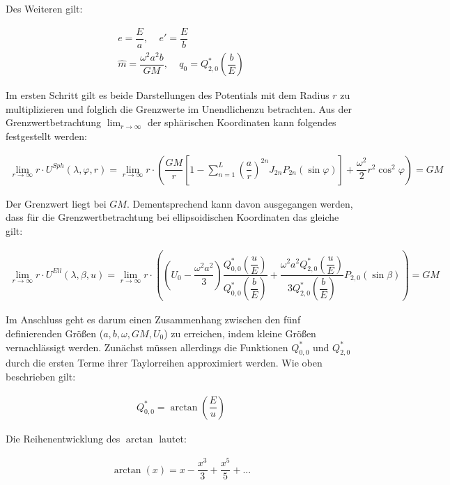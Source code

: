 Des Weiteren gilt:

\begin{gather*}
e = \dfrac{E}{a}, ~~~~~ e'= \dfrac{E}{b} \\
\hat{m} = \dfrac{\omega^2 a^2 b }{GM}, ~~~~~ q_0 = Q_{2,0}^{*} \left(\dfrac{b}{E}\right)
\end{gather*}

Im ersten Schritt gilt es beide Darstellungen des Potentials mit dem Radius $r$ zu multiplizieren und folglich die Grenzwerte 	\dq im Unendlichen\dq zu betrachten. Aus der Grenzwertbetrachtung $\lim_{r \rightarrow \infty}$ der sphärischen Koordinaten kann folgendes festgestellt werden:

\begin{align*}
\lim_{r \rightarrow \infty} r \cdot U^{Sph}(\lambda,\varphi,r) = \lim_{r \rightarrow \infty} r \cdot \left(\dfrac{GM}{r} \left[1-\sum_{n=1}^{L} \left(\dfrac{a}{r}\right)^{2n} J_{2n} P_{2n} (\sin \varphi)\right] + \dfrac{\omega^2}{2} r^2 \cos^2 \varphi\right) = GM
\end{align*}

Der Grenzwert liegt bei $GM$. Dementsprechend kann davon ausgegangen werden, dass für die Grenzwertbetrachtung bei ellipsoidischen Koordinaten das gleiche gilt:

\begin{align*}
\lim_{r \rightarrow \infty} r \cdot U^{Ell}(\lambda,\beta,u) = \lim_{r \rightarrow \infty} r \cdot \left(\left(U_0 - \dfrac{\omega^2 a^2}{3}\right) \dfrac{Q_{0,0}^{*}\left(\dfrac{u}{E}\right)}{{Q_{0,0}^{*}\left(\dfrac{b}{E}\right)}} + \dfrac{\omega^2 a^2 Q_{2,0}^{*}\left(\dfrac{u}{E}\right)}{3 Q_{2,0}^{*}\left(\dfrac{b}{E}\right)} P_{2,0}(\sin \beta)\right) = GM
\end{align*}

Im Anschluss geht es darum einen Zusammenhang zwischen den fünf definierenden Größen ($a,b,\omega,GM,U_0$) zu erreichen, indem kleine Größen vernachlässigt werden. Zunächst müssen allerdings die Funktionen $Q_{0,0}^{*}$ und $Q_{2,0}^{*}$ durch die ersten Terme ihrer Taylorreihen approximiert werden. Wie oben beschrieben gilt: 

\begin{align*}
Q_{0,0}^{*} = \arctan \left(\dfrac{E}{u}\right)
\end{align*}

Die Reihenentwicklung des $\arctan$ lautet: 

\begin{align*}
\arctan(x) = x- \dfrac{x^3}{3} + \dfrac{x^5}{5} + ...
\end{align*}

